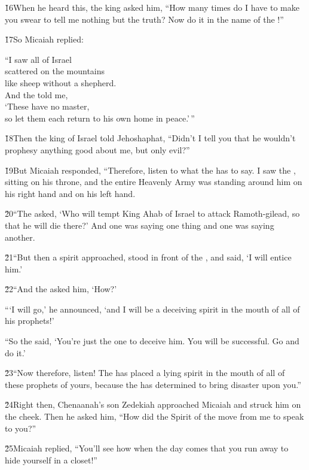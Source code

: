 \v{16}When he heard this, the king asked him, ``How many times do I have to make you swear to tell me nothing but the truth? Now do it in the name of the !''

\v{17}So Micaiah replied:

\begin{poetry}
\poeml ``I saw all of Israel \\
\poemll    scattered on the mountains \\
\poemlll       like sheep without a shepherd. \\
\poeml And the  told me, \\
\poemll    `These have no master, \\
\poemlll       so let them each return to his own home in peace.'\,''
\end{poetry}

\v{18}Then the king of Israel told Jehoshaphat, ``Didn't I tell you that he wouldn't prophesy anything good about me, but only evil?''

\v{19}But Micaiah responded, ``Therefore, listen to what the  has to say. I saw the , sitting on his throne, and the entire Heavenly Army was standing around him on his right hand and on his left hand.

\v{20}``The  asked, `Who will tempt King Ahab of Israel to attack Ramoth-gilead, so that he will die there?' And one was saying one thing and one was saying another.

\v{21}``But then a spirit approached, stood in front of the , and said, `I will entice him.'

\v{22}``And the  asked him, `How?'

```I will go,' he announced, `and I will be a deceiving spirit in the mouth of all of his prophets!'

``So the  said, `You're just the one to deceive him. You will be successful. Go and do it.'

\v{23}``Now therefore, listen! The  has placed a lying spirit in the mouth of all of these prophets of yours, because the  has determined to bring disaster upon you.''

\v{24}Right then, Chenaanah's son Zedekiah approached Micaiah and struck him on the cheek. Then he asked him, ``How did the Spirit of the  move from me to speak to you?''

\v{25}Micaiah replied, ``You'll see how when the day comes that you run away to hide yourself in a closet!''


